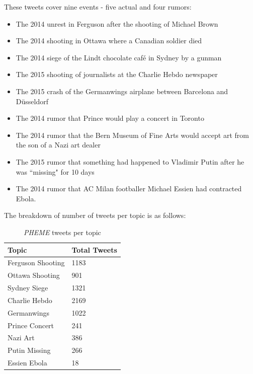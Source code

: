 \documentclass[preprint,review,12pt]{elsarticle}
\begin{document}
These tweets cover nine events - five actual and four rumors:
\begin{itemize}
    \item The 2014 unrest in Ferguson after the shooting of Michael Brown
    \item The 2014 shooting in Ottawa where a Canadian soldier died
    \item The 2014 siege of the Lindt chocolate caf{\'e} in Sydney by a gunman 
    \item The 2015 shooting of journalists at the Charlie Hebdo newspaper
    \item The 2015 crash of the Germanwings airplane between Barcelona and D\"{u}sseldorf
    \item The 2014 rumor that Prince would play a concert in Toronto
    \item The 2014 rumor that the Bern Museum of Fine Arts would accept art from the son of a Nazi art dealer
    \item The 2015 rumor that something had happened to Vladimir Putin after he was ``missing" for 10 days
    \item The 2014 rumor that AC Milan footballer Michael Essien had contracted Ebola.
\end{itemize}
The breakdown of number of tweets per topic is as follows:
\begin{table}[h]
    \centering
    \begin{tabular}{|p{4cm}|p{3cm}|}
    \hline
    Topic & Total Tweets \\
    \hline
         Ferguson Shooting & 1183 \\
         Ottawa Shooting & 901 \\
         Sydney Siege & 1321 \\
         Charlie Hebdo & 2169 \\
         Germanwings & 1022 \\
         Prince Concert & 241 \\
         Nazi Art & 386 \\
         Putin Missing & 266 \\
         Essien Ebola & 18 \\
    \hline
    \end{tabular}
    \caption{\textit{PHEME} tweets per topic}
    \label{tab:pheme tweets per topic}
\end{table}
\end{document}
